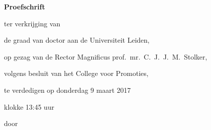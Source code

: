 \begin{titlepage}

\begin{center}

\vspace*{2\bigskipamount}

{\makeatletter
\titlestyle\bfseries\LARGE\@title
\makeatother}

{\makeatletter
\ifx\@subtitle\undefined\else
    \bigskip
    \titlefont\titleshape\Large\@subtitle
\fi
\makeatother}

\end{center}

\cleardoublepage
\thispagestyle{empty}

\begin{center}


\vspace*{2\bigskipamount}

{\makeatletter
\titlestyle\bfseries\LARGE\@title
\makeatother}

{\makeatletter
\ifx\@subtitle\undefined\else
    \bigskip
    \titlefont\titleshape\Large\@subtitle
\fi
\makeatother}

\vfill


{\Large\titlefont\bfseries Proefschrift}

\bigskip
\bigskip

ter verkrijging van 

de graad van doctor aan de Universiteit Leiden,

op gezag van de Rector Magnificus prof.~mr.~C.~J.~J.~M.~Stolker,

volgens besluit van het College voor Promoties,

te verdedigen op donderdag 9 maart 2017 

klokke 13:45 uur

\bigskip
\bigskip

door

\bigskip
\bigskip

\makeatletter
{\Large\titlefont\bfseries\@firstname\ {\titleshape\@lastname}}
\makeatother


\end{center}
\end{titlepage}
